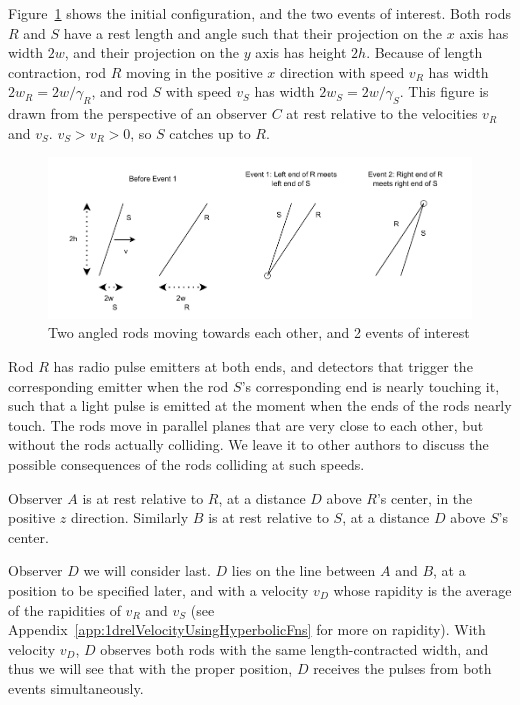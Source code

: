 \documentclass[a4paper]{article}
\theoremstyle{plain}
\theoremstyle{definition}
\begin{document}
Figure~\ref{fig:scenario-3b} shows the initial
configuration, and the two events of interest.  Both rods $R$ and $S$
have a rest length and angle such that their projection on the $x$
axis has width $2w$, and their projection on the $y$ axis has height
$2h$.  Because of length contraction, rod $R$ moving in the positive
$x$ direction with speed $v_R$ has width $2w_R = 2w/\gamma_R$, and rod
$S$ with speed $v_S$ has width $2w_S = 2w/\gamma_S$.  This figure is
drawn from the perspective of an observer $C$ at rest relative to the
velocities $v_R$ and $v_S$.  $v_S > v_R > 0$, so $S$ catches up to
$R$.
\begin{figure}[ht]
	\centering
	\includegraphics[width=1.0\textwidth]{scenario3b-events-cropped.pdf}
	\caption{Two angled rods moving towards each other, and 2 events of interest}
	\label{fig:scenario-3b}
\end{figure}

Rod $R$ has radio pulse emitters at both ends, and detectors that
trigger the corresponding emitter when the rod $S$'s corresponding end
is nearly touching it, such that a light pulse is emitted at the
moment when the ends of the rods nearly touch.  The rods move in
parallel planes that are very close to each other, but without the
rods actually colliding.  We leave it to other authors to discuss the
possible consequences of the rods colliding at such speeds.

Observer $A$ is at rest relative to $R$, at a distance $D$ above $R$'s
center, in the positive $z$ direction.  Similarly $B$ is at rest
relative to $S$, at a distance $D$ above $S$'s center.

Observer $D$ we will consider last.  $D$ lies on the line between $A$
and $B$, at a position to be specified later, and with a velocity
$v_D$ whose rapidity is the average of the rapidities of $v_R$ and
$v_S$ (see Appendix~\ref{app:1drelVelocityUsingHyperbolicFns} for more
on rapidity).  With velocity $v_D$, $D$ observes both rods with the
same length-contracted width, and thus we will see that with the
proper position, $D$ receives the pulses from both events
simultaneously.
\end{document}
